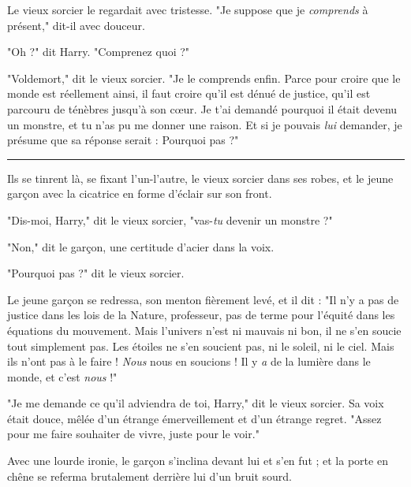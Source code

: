 Le vieux sorcier le regardait avec tristesse. "Je suppose que je \emph{comprends}  à présent," dit-il avec douceur.

"Oh ?" dit Harry. "Comprenez quoi ?"

"Voldemort," dit le vieux sorcier. "Je le comprends enfin. Parce pour croire que le monde est réellement ainsi, il faut croire qu'il est dénué de justice, qu'il est parcouru de ténèbres jusqu'à son cœur. Je t'ai demandé pourquoi il était devenu un monstre, et tu n'as pu me donner une raison. Et si je pouvais \emph{lui}  demander, je présume que sa réponse serait : Pourquoi pas ?"
\par\noindent\rule{\textwidth}{0.4pt}
Ils se tinrent là, se fixant l'un-l'autre, le vieux sorcier dans ses robes, et le jeune garçon avec la cicatrice en forme d'éclair sur son front.

"Dis-moi, Harry," dit le vieux sorcier, "vas-\emph{tu}  devenir un monstre ?"

"Non," dit le garçon, une certitude d'acier dans la voix.

"Pourquoi pas ?" dit le vieux sorcier.

Le jeune garçon se redressa, son menton fièrement levé, et il dit : "Il n'y a pas de justice dans les lois de la Nature, professeur, pas de terme pour l'équité dans les équations du mouvement. Mais l'univers n'est ni mauvais ni bon, il ne s'en soucie tout simplement pas. Les étoiles ne s'en soucient pas, ni le soleil, ni le ciel. Mais ils n'ont pas à le faire ! \emph{Nous}  nous en soucions ! Il y \emph{a}  de la lumière dans le monde, et c'est \emph{nous}  !"

"Je me demande ce qu'il adviendra de toi, Harry," dit le vieux sorcier. Sa voix était douce, mêlée d'un étrange émerveillement et d'un étrange regret. "Assez pour me faire souhaiter de vivre, juste pour le voir."

Avec une lourde ironie, le garçon s'inclina devant lui et s'en fut ; et la porte en chêne se referma brutalement derrière lui d'un bruit sourd.

